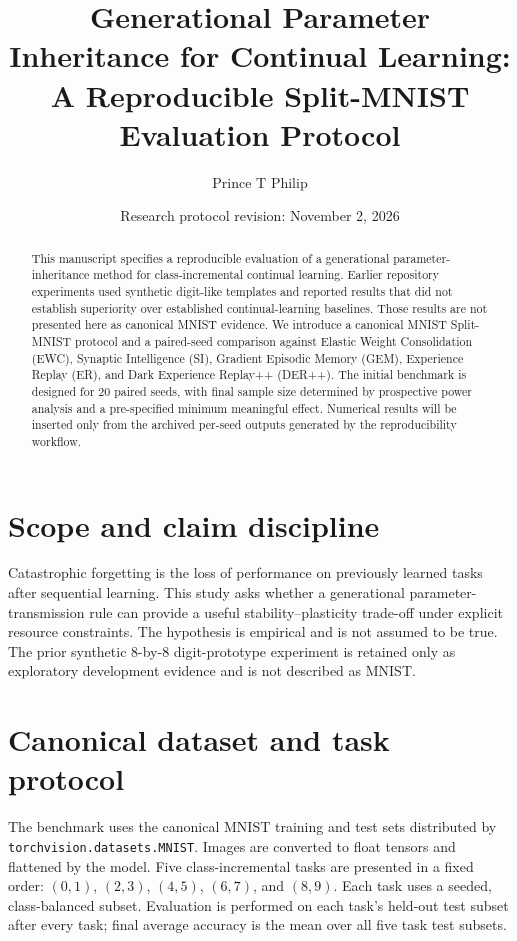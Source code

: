 \documentclass[11pt,a4paper]{article}
\title{Generational Parameter Inheritance for Continual Learning: A Reproducible Split-MNIST Evaluation Protocol}
\author{Prince T Philip}
\date{Research protocol revision: November 2, 2026}
\begin{document}
\maketitle

\begin{abstract}
This manuscript specifies a reproducible evaluation of a generational parameter-inheritance method for class-incremental continual learning. Earlier repository experiments used synthetic digit-like templates and reported results that did not establish superiority over established continual-learning baselines. Those results are not presented here as canonical MNIST evidence. We introduce a canonical MNIST Split-MNIST protocol and a paired-seed comparison against Elastic Weight Consolidation (EWC), Synaptic Intelligence (SI), Gradient Episodic Memory (GEM), Experience Replay (ER), and Dark Experience Replay++ (DER++). The initial benchmark is designed for 20 paired seeds, with final sample size determined by prospective power analysis and a pre-specified minimum meaningful effect. Numerical results will be inserted only from the archived per-seed outputs generated by the reproducibility workflow.
\end{abstract}

\section{Scope and claim discipline}
Catastrophic forgetting is the loss of performance on previously learned tasks after sequential learning. This study asks whether a generational parameter-transmission rule can provide a useful stability--plasticity trade-off under explicit resource constraints. The hypothesis is empirical and is not assumed to be true. The prior synthetic 8-by-8 digit-prototype experiment is retained only as exploratory development evidence and is not described as MNIST.

\section{Canonical dataset and task protocol}
The benchmark uses the canonical MNIST training and test sets distributed by \texttt{torchvision.datasets.MNIST}. Images are converted to float tensors and flattened by the model. Five class-incremental tasks are presented in a fixed order: $(0,1)$, $(2,3)$, $(4,5)$, $(6,7)$, and $(8,9)$. Each task uses a seeded, class-balanced subset. Evaluation is performed on each task's held-out test subset after every task; final average accuracy is the mean over all five task test subsets.
\end{document}
